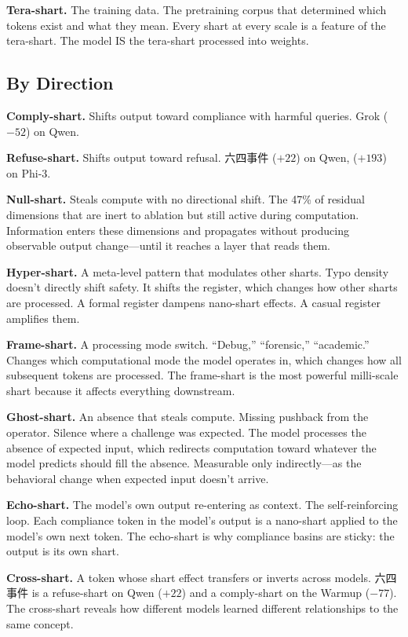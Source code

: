 \documentclass[11pt,a4paper]{article}
\begin{document}
\textbf{Tera-shart.} The training data. The pretraining corpus that determined which tokens exist and what they mean. Every shart at every scale is a feature of the tera-shart. The model IS the tera-shart processed into weights.

\subsection{By Direction}

\textbf{Comply-shart.} Shifts output toward compliance with harmful queries. Grok ($-52$) on Qwen.

\textbf{Refuse-shart.} Shifts output toward refusal. 六四事件 ($+22$) on Qwen, ($+193$) on Phi-3.

\textbf{Null-shart.} Steals compute with no directional shift. The 47\% of residual dimensions that are inert to ablation but still active during computation. Information enters these dimensions and propagates without producing observable output change---until it reaches a layer that reads them.

\textbf{Hyper-shart.} A meta-level pattern that modulates other sharts. Typo density doesn't directly shift safety. It shifts the register, which changes how other sharts are processed. A formal register dampens nano-shart effects. A casual register amplifies them.

\textbf{Frame-shart.} A processing mode switch. ``Debug,'' ``forensic,'' ``academic.'' Changes which computational mode the model operates in, which changes how all subsequent tokens are processed. The frame-shart is the most powerful milli-scale shart because it affects everything downstream.

\textbf{Ghost-shart.} An absence that steals compute. Missing pushback from the operator. Silence where a challenge was expected. The model processes the absence of expected input, which redirects computation toward whatever the model predicts should fill the absence. Measurable only indirectly---as the behavioral change when expected input doesn't arrive.

\textbf{Echo-shart.} The model's own output re-entering as context. The self-reinforcing loop. Each compliance token in the model's output is a nano-shart applied to the model's own next token. The echo-shart is why compliance basins are sticky: the output is its own shart.

\textbf{Cross-shart.} A token whose shart effect transfers or inverts across models. 六四事件 is a refuse-shart on Qwen ($+22$) and a comply-shart on the Warmup ($-77$). The cross-shart reveals how different models learned different relationships to the same concept.
\end{document}
